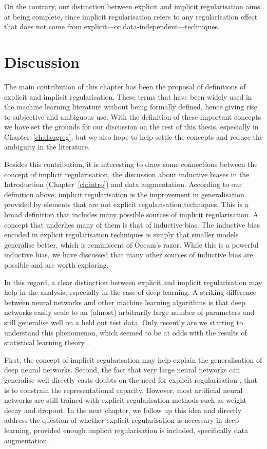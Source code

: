 {On the contrary, our distinction between explicit and implicit regularisation aims at being complete, since implicit regularisation refers to any regularisation effect that does not come from explicit---or data-independent---techniques.

\section{Discussion}
\label{sec:reg-discussion}
The main contribution of this chapter has been the proposal of definitions of explicit and implicit regularisation. These terms that have been widely used in the machine learning literature without being formally defined, hence giving rise to subjective and ambiguous use. With the definition of these important concepts we have set the grounds for our discussion on the rest of this thesis, especially in Chapter~\ref{ch:daugreg}, but we also hope to help settle the concepts and reduce the ambiguity in the literature.

Besides this contribution, it is interesting to draw some connections between the concept of implicit regularisation, the discussion about inductive biases in the Introduction (Chapter~\ref{ch:intro}) and data augmentation. According to our definition above, implicit regularisation is the improvement in generalisation provided by elements that are not explicit regularisation techniques. This is a broad definition that includes many possible sources of implicit regularisation. A concept that underlies many of them is that of inductive bias. The inductive bias encoded in explicit regularisation techniques is simply that smaller models generalise better, which is reminiscent of Occam's razor. While this is a powerful inductive bias, we have discussed that many other sources of inductive bias are possible and are worth exploring.

In this regard, a clear distinction between explicit and implicit regularisation may help in the analysis, especially in the case of deep learning. A striking difference between neural networks and other machine learning algorithms is that deep networks easily scale to an (almost) arbitrarily large number of parameters and still generalise well on a held out test data. Only recently are we starting to understand this phenomenon, which seemed to be at odds with the results of statistical learning theory \citep{belkin2019biasvariance}. 

First, the concept of implicit regularisation may help explain the generalisation of deep neural networks. Second, the fact that very large neural networks can generalise well directly casts doubts on the need for explicit regularisation \citep{zhang2016understandingdl}, that is to constrain the representational capacity. However, most artificial neural networks are still trained with explicit regularisation methods such as weight decay and dropout. In the next chapter, we follow up this idea and directly address the question of whether explicit regularisation is necessary in deep learning, provided enough implicit regularisation is included, specifically data augmentation.

\chapterbibliography
}
